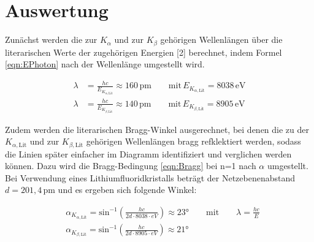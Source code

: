 \documentclass[titlepage = firstcover]{scrartcl}
\begin{document}
    \newpage
    \section{Auswertung}
        Zunächst werden die zur $K_{\alpha}$ und zur $K_{\beta}$ gehörigen Wellenlängen über die literarischen Werte der zugehörigen Energien [2] 
        berechnet, indem Formel \ref{eqn:EPhoton} nach der Wellenlänge umgestellt wird.

        \begin{align}
            \lambda &= \frac{hc}{E_{K_{\alpha, \text{Lit}}}} \approx 160 \,\text{pm} \qquad \text{mit} \, E_{K_{\alpha, \text{Lit}}}=8038 \, \text{eV} \\
            \lambda &= \frac{hc}{E_{K_{\beta, \text{Lit}}}} \approx 140 \,\text{pm} \qquad \text{mit} \, E_{K_{\beta, \text{Lit}}}=8905 \, \text{eV} 
        \end{align}

        \noindent
        Zudem werden die literarischen Bragg-Winkel ausgerechnet, bei denen die zu der $K_{\alpha, \text{Lit}}$ und zur $K_{\beta, \text{Lit}}$ gehörigen Wellenlängen bragg refklektiert werden, 
        sodass die Linien später einfacher im Diagramm identifiziert und verglichen werden können. Dazu wird die Bragg-Bedingung \ref{eqn:Bragg} bei n=1 
        nach $\alpha$ umgestellt. Bei Verwendung eines Lithiumfluoridkristalls beträgt der Netzebenenabstand $d=201,4 \, \text{pm}$ und es ergeben sich
        folgende Winkel:

        \begin{align}
            &\alpha_{K_{\alpha, \text{Lit}}} = \text{sin}^{-1}\left(\frac{hc}{2d \cdot 8038\cdot eV }\right) \approx 23° \qquad \text{mit} \qquad \lambda = \frac{hc}{E} \\
            &\alpha_{K_{\beta, \text{Lit}}}  = \text{sin}^{-1}\left(\frac{hc}{2d \cdot 8905\cdot eV }\right) \approx 21°
        \end{align}
\end{document}
